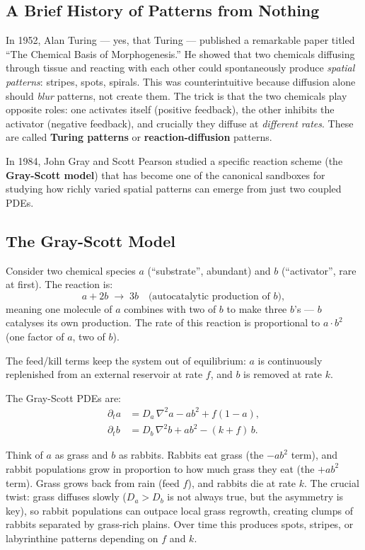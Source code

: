 \documentclass[12pt,a4paper]{article}
\begin{document}
\subsection{A Brief History of Patterns from Nothing}

In 1952, Alan Turing — yes, that Turing — published
a remarkable paper titled ``The Chemical Basis of Morphogenesis.''
He showed that two chemicals diffusing through tissue
and reacting with each other could spontaneously produce
\emph{spatial patterns}: stripes, spots, spirals.
This was counterintuitive because diffusion alone should \emph{blur}
patterns, not create them.
The trick is that the two chemicals play opposite roles:
one activates itself (positive feedback),
the other inhibits the activator (negative feedback),
and crucially they diffuse at \emph{different rates}.
These are called \textbf{Turing patterns} or
\textbf{reaction-diffusion} patterns.

In 1984, John Gray and Scott Pearson studied a specific
reaction scheme (the \textbf{Gray-Scott model}) that has become
one of the canonical sandboxes for studying how richly varied
spatial patterns can emerge from just two coupled PDEs.

\subsection{The Gray-Scott Model}

Consider two chemical species $a$ (``substrate'', abundant)
and $b$ (``activator'', rare at first).
The reaction is:
\[
  a + 2b \;\to\; 3b \quad\text{(autocatalytic production of }b\text{)},
\]
meaning one molecule of $a$ combines with two of $b$ to make
three $b$'s — $b$ catalyses its own production.
The rate of this reaction is proportional to
$a \cdot b^2$ (one factor of $a$, two of $b$).

The feed/kill terms keep the system out of equilibrium:
$a$ is continuously replenished from an external reservoir at rate $f$,
and $b$ is removed at rate $k$.

The Gray-Scott PDEs are:
\begin{align}
  \partial_t a &= D_a\,\nabla^2 a - a b^2 + f(1-a), \label{eq:GS_a}\\
  \partial_t b &= D_b\,\nabla^2 b + a b^2 - (k+f)\,b. \label{eq:GS_b}
\end{align}

\begin{tcolorbox}[intubox={Intuition for Gray-Scott}]
Think of $a$ as grass and $b$ as rabbits.
Rabbits eat grass (the $-ab^2$ term), and rabbit populations
grow in proportion to how much grass they eat (the $+ab^2$ term).
Grass grows back from rain (feed $f$), and rabbits die at rate $k$.
The crucial twist: grass diffuses slowly ($D_a > D_b$ is not always true,
but the asymmetry is key),
so rabbit populations can outpace local grass regrowth,
creating clumps of rabbits separated by grass-rich plains.
Over time this produces spots, stripes, or labyrinthine patterns
depending on $f$ and $k$.
\end{tcolorbox}
\end{document}
